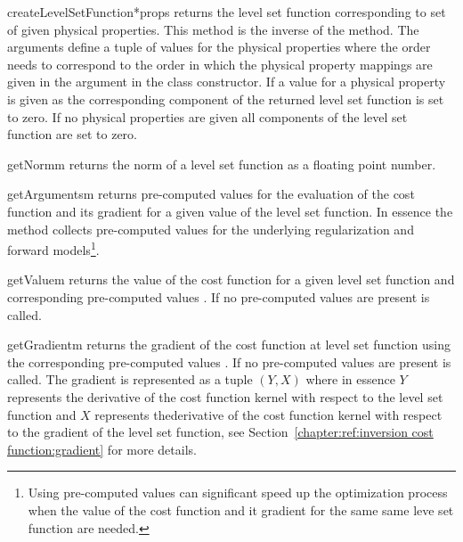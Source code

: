 \begin{methoddesc}[InversionCostFunction]{createLevelSetFunction}{*props}
returns the level set function corresponding to set of given physical properties. 
This method is the inverse of the  method.
The arguments  define a tuple of values for the  physical properties
where the order needs to correspond to the order in which the physical property mappings 
are given in the  argument
in the class constructor. If a value for a physical property 
is given as \None the corresponding component of the returned level set function is set to zero.
If no physical properties are given all components of the level set function are set to zero.
\end{methoddesc}
    
\begin{methoddesc}[InversionCostFunction]{getNorm}{m}
returns the norm of a level set function  as a floating point number.
\end{methoddesc}

\begin{methoddesc}[InversionCostFunction]{getArguments}{m}
returns pre-computed values for the evaluation of the 
cost function and its gradient for a given value  
of the level set function. In essence the method collects
pre-computed values for the underlying regularization and forward models\footnote{Using pre-computed 
values can significant speed up the optimization process when the value
of the cost function and it gradient for the same same leve set function 
are needed.}.
\end{methoddesc}

\begin{methoddesc}[InversionCostFunction]{getValue}{m }
returns the value of the cost function for a given level set function 
and corresponding pre-computed values . If no pre-computed values are present
 is called.
\end{methoddesc}

\begin{methoddesc}[InversionCostFunction]{getGradient}{m }
returns the gradient of the cost function  at level set function 
using the corresponding pre-computed values . If no pre-computed values are present
 is called. The gradient 
is represented as a tuple $(Y,X)$ where in essence 
$Y$ represents the derivative of the cost function kernel with respect to the 
level set function and $X$ represents thederivative of the cost function kernel with respect to the gradient of the 
level set function, see Section~\ref{chapter:ref:inversion cost function:gradient} for more details.
\end{methoddesc}
       

